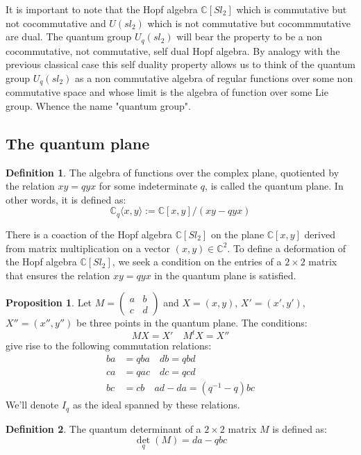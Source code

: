 \documentclass[11pt]{article}
\theoremstyle{definition}
\newtheorem{Prop}{Proposition}[section]
\newtheorem{Def}{Definition}[section]
\begin{document}
It is important to note that the Hopf algebra $\mathbb{C}[Sl_2]$ which is commutative but not cocommutative and $U(sl_2)$ which is not commutative but cocommmutative are dual. The quantum group $U_q(sl_2)$ will bear the property to be a non cocommutative, not commutative, self dual Hopf algebra. By analogy with the previous classical case this self duality property allows us to think of the quantum group $U_q(sl_2)$ as a non commutative algebra of regular functions over some non commutative space and whose limit is the algebra of function over some Lie group. Whence the name "quantum group".
\subsection{\Large \textbf{The quantum plane}}
\begin{Def} The algebra of functions over the complex plane, quotiented by the relation \(xy=qyx\) for some indeterminate \(q\), is called the quantum plane. In other words, it is defined as: 
\[\mathbb{C}_q\langle x,y\rangle:=\mathbb{C}[x,y]/(xy-qyx)\]

There is a coaction of the Hopf algebra \(\mathbb{C}[Sl_2]\) on the plane \(\mathbb{C}[x,y]\) derived from matrix multiplication on a vector \((x,y)\in\mathbb{C}^2\). To define a deformation of the Hopf algebra \(\mathbb{C}[Sl_2]\), we seek a condition on the entries of a \(2\times 2\) matrix that ensures the relation \(xy=qyx\) in the quantum plane is satisfied.

\begin{Prop} Let \(M=\begin{pmatrix} a & b \\ c & d \end{pmatrix}\) and \(X=(x,y)\), \(X'=(x',y')\), \(X''=(x'',y'')\) be three points in the quantum plane. The conditions:
\[MX=X' \quad M^tX=X''\]
give rise to the following commutation relations:
\begin{align*}
ba &= qba \quad db = qbd \\
ca &= qac \quad dc = qcd \\
bc &= cb \quad ad-da = (q^{-1}-q)bc
\end{align*}
We'll denote \(I_q\) as the ideal spanned by these relations.
\end{Prop}
\end{Def}
\pagebreak
\begin{Def} The quantum determinant of a \(2\times 2\) matrix \(M\) is defined as:
\[\det_q(M) = da - qbc\]
\end{Def}
\end{document}
